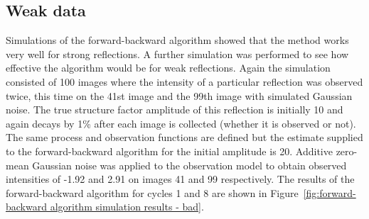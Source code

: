 \subsection{Weak data}
\label{sub:Weak Data}
Simulations of the forward-backward algorithm showed that the method works very well for strong reflections.
A further simulation was performed to see how effective the algorithm would be for weak reflections.
Again the simulation consisted of 100 images where the intensity of a particular reflection was observed twice, this time on the 41st image and the 99th image with simulated Gaussian noise.
The true structure factor amplitude of this reflection is initially 10 and again decays by 1\% after each image is collected (whether it is observed or not).
The same process and observation functions are defined but the estimate supplied to the forward-backward algorithm for the initial amplitude is 20.
Additive zero-mean Gaussian noise was applied to the observation model to obtain observed intensities of -1.92 and 2.91 on images 41 and 99 respectively.
The results of the forward-backward algorithm for cycles 1 and 8 are shown in Figure~\ref{fig:forward-backward algorithm simulation results - bad}.
